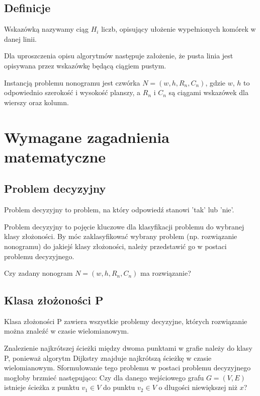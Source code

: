 \subsection{Definicje}
\begin{definition}
    Wskazówką nazywamy ciąg $H_i$ liczb, opisujący ułożenie wypełnionych komórek w danej linii.
\end{definition}
\begin{remark}
    Dla uproszczenia opisu algorytmów następuje założenie, że pusta linia jest opisywana przez
wskazówkę będącą ciągiem pustym.
\end{remark}
\begin{definition}
    Instancją problemu nonogramu jest czwórka $N = (w, h, R_n, C_n)$, gdzie $w$, $h$ to odpowiednio
szerokość i wysokość planszy, a $R_n$ i $C_n$ są ciągami wskazówek dla wierszy oraz kolumn.
\end{definition}


\section{Wymagane zagadnienia matematyczne}

\subsection{Problem decyzyjny}
\begin{definition}
    Problem decyzyjny to problem, na który odpowiedź stanowi 'tak' lub 'nie'.
\end{definition}
    Problem decyzyjny to pojęcie kluczowe dla klasyfikacji problemu do wybranej klasy złożoności.
By móc zaklasyfikować wybrany problem (np. rozwiązanie nonogramu) do jakiejś klasy złożoności,
należy przedstawić go w postaci problemu decyzyjnego.
\begin{example}
    Czy zadany nonogram $N = (w, h, R_n, C_n)$ ma rozwiązanie?
\end{example}

\subsection{Klasa złożoności P}
\begin{definition}
    Klasa złożoności P zawiera wszystkie problemy decyzyjne, których rozwiązanie można znaleźć w czasie wielomianowym.
\end{definition}
\begin{example}
    Znalezienie najkrótszej ścieżki między dwoma punktami w grafie należy do klasy P, ponieważ
algorytm Dijkstry znajduje najkrótszą ścieżkę w czasie wielomianowym. Sformułowanie tego problemu
w postaci problemu decyzyjnego mogłoby brzmieć następująco: Czy dla danego wejściowego grafu $G = (V, E)$
istnieje ścieżka z punktu $v_1 \in V$ do punktu $v_2 \in V$ o długości niewiększej niż $x$?
\end{example}

